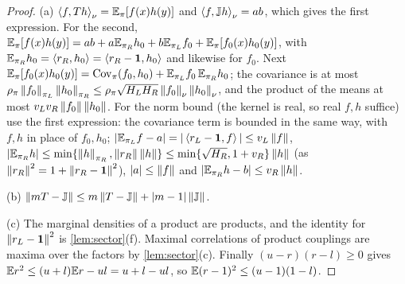 \begin{proof}
(a) $\left\langle f,Th\right\rangle_\nu=\mathbb E_\pi[f(x)h(y)]$ and $\left\langle f,\mathbb J h\right\rangle_\nu=ab$, which gives
the first expression. For the second,
$\mathbb E_\pi[f(x)h(y)]=ab+a\mathbb E_{\pi_R}h_0+b\mathbb E_{\pi_L}f_0+\mathbb E_\pi[f_0(x)h_0(y)]$, with
$\mathbb E_{\pi_R}h_0=\left\langle r_R,h_0\right\rangle=\left\langle r_R-\mathbf 1,h_0\right\rangle$ and likewise for $f_0$. Next
$\mathbb E_\pi[f_0(x)h_0(y)]=\operatorname{Cov}_\pi(f_0,h_0)+\mathbb E_{\pi_L}f_0\,\mathbb E_{\pi_R}h_0$;
the covariance is at most $\rho_\pi\left\|f_0\right\|_{\pi_L}\left\|h_0\right\|_{\pi_R}\le
\rho_\pi\sqrt{H_LH_R}\left\|f_0\right\|_\nu\left\|h_0\right\|_\nu$, and the product of the means
at most $v_Lv_R\left\|f_0\right\|\left\|h_0\right\|$. For the norm bound (the kernel is real, so
real $f,h$ suffice) use the first expression: the covariance term is bounded in
the same way, with $f,h$ in place
of $f_0,h_0$; $|\mathbb E_{\pi_L}f-a|=|\left\langle r_L-\mathbf 1,f\right\rangle|\le v_L\left\|f\right\|$,
$|\mathbb E_{\pi_R}h|\le\min\{\left\|h\right\|_{\pi_R},\left\|r_R\right\|\left\|h\right\|\}\le
\min\{\sqrt{H_R},1+v_R\}\left\|h\right\|$ (as $\left\|r_R\right\|^2=1+\left\|r_R-\mathbf 1\right\|^2$),
$|a|\le\left\|f\right\|$ and $|\mathbb E_{\pi_R}h-b|\le v_R\left\|h\right\|$.

(b) $\left\|mT-\mathbb J\right\|\le m\left\|T-\mathbb J\right\|+|m-1|\left\|\mathbb J\right\|$.

(c) The marginal densities of a product are products, and the identity for
$\left\|r_L-\mathbf 1\right\|^2$ is \cref{lem:sector}(f). Maximal correlations of product
couplings are maxima over the factors by \cref{lem:sector}(c). Finally
$(u-r)(r-l)\ge0$ gives $\mathbb E r^2\le(u+l)\mathbb E r-ul=u+l-ul$, so
$\mathbb E(r-1)^2\le(u-1)(1-l)$.
\end{proof}

